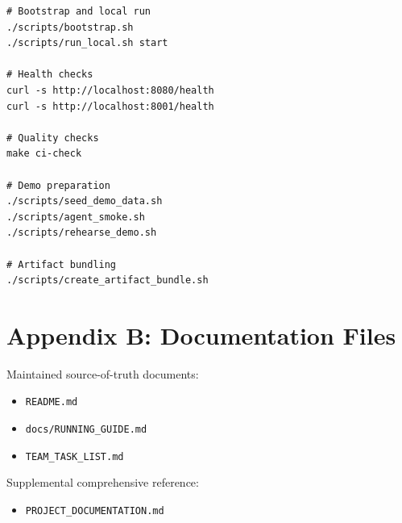 \documentclass[11pt,a4paper]{article}
\begin{document}
\begin{lstlisting}[style=bashstyle]
# Bootstrap and local run
./scripts/bootstrap.sh
./scripts/run_local.sh start

# Health checks
curl -s http://localhost:8080/health
curl -s http://localhost:8001/health

# Quality checks
make ci-check

# Demo preparation
./scripts/seed_demo_data.sh
./scripts/agent_smoke.sh
./scripts/rehearse_demo.sh

# Artifact bundling
./scripts/create_artifact_bundle.sh
\end{lstlisting}

\section*{Appendix B: Documentation Files}

Maintained source-of-truth documents:

\begin{itemize}[leftmargin=1.5em]
    \item \texttt{README.md}
    \item \texttt{docs/RUNNING\_GUIDE.md}
    \item \texttt{TEAM\_TASK\_LIST.md}
\end{itemize}

Supplemental comprehensive reference:

\begin{itemize}[leftmargin=1.5em]
    \item \texttt{PROJECT\_DOCUMENTATION.md}
\end{itemize}
\end{document}
